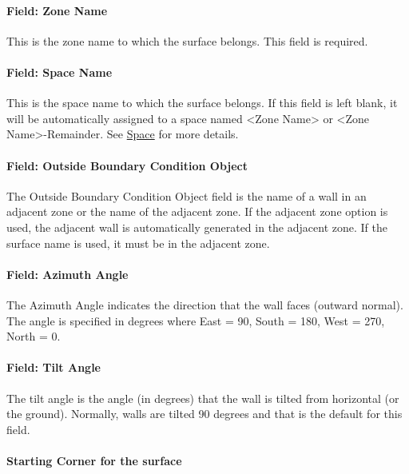 \paragraph{Field: Zone Name}\label{field-zone-name-3-006}

This is the zone name to which the surface belongs. This field is required.

\paragraph{Field: Space Name}\label{field-space-name-3-006}

This is the space name to which the surface belongs. If this field is left blank, it will be automatically assigned to a space named <Zone Name> or <Zone Name>-Remainder. See \hyperref[space]{Space} for more details.

\paragraph{Field: Outside Boundary Condition Object}\label{field-outside-boundary-condition-object}

The Outside Boundary Condition Object field is the name of a wall in an adjacent zone or the name of the adjacent zone. If the adjacent zone option is used, the adjacent wall is automatically generated in the adjacent zone. If the surface name is used, it must be in the adjacent zone.

\paragraph{Field: Azimuth Angle}\label{field-azimuth-angle-3}

The Azimuth Angle indicates the direction that the wall faces (outward normal). The angle is specified in degrees where East = 90, South = 180, West = 270, North = 0.

\paragraph{Field: Tilt Angle}\label{field-tilt-angle-3}

The tilt angle is the angle (in degrees) that the wall is tilted from horizontal (or the ground). Normally, walls are tilted 90 degrees and that is the default for this field.

\paragraph{Starting Corner for the surface}\label{starting-corner-for-the-surface-3}

